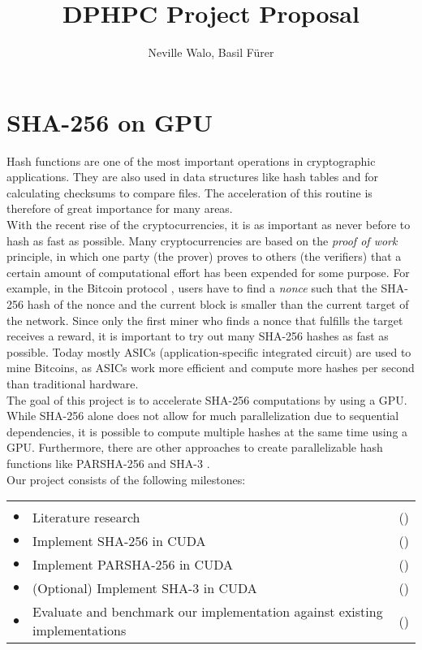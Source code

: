 \documentclass[a4paper]{article}
\author{Neville Walo, Basil F\"urer}
\title {DPHPC Project Proposal}
\newenvironment{reqlist}{%
  \par \medskip \noindent
  \begin{tabular}{cp{0.83\textwidth}r} \\[-24pt]}{\end{tabular}}
\newcommand{\req}{\\ \smallskip \smallskip $\bullet$\hspace{-0.2cm} & }
\newcounter{num}
\newcommand\effort[1]{\mbox{(\forloop{num}{0}{\value{num} < #1}{$\star$})}}
\begin{document}
\parindent 0pt
\maketitle

\section*{SHA-256 on GPU}
Hash functions are one of the most important operations in cryptographic applications. They are also used in data structures like hash tables and for calculating checksums to compare files. The acceleration of this routine is therefore of great importance for many areas.\\

With the recent rise of the cryptocurrencies, it is as important as never before to hash as fast as possible. 
Many cryptocurrencies are based on the \textit{proof of work} principle, in which one party (the prover) proves to others (the verifiers) that a certain amount of computational effort has been expended for some purpose. For example, in the Bitcoin protocol \cite{nakamoto2012bitcoin}, users have to find a \emph{nonce} such that the SHA-256 hash of the nonce and the current block is smaller than the current target of the network. Since only the first miner who finds a nonce that fulfills the target receives a reward, it is important to try out many SHA-256 hashes as fast as possible. Today mostly ASICs (application-specific integrated circuit) are used to mine Bitcoins, as ASICs work more efficient and compute more hashes per second than traditional hardware.\\


The goal of this project is to accelerate SHA-256 computations by using a GPU.
While SHA-256 alone does not allow for much parallelization due to sequential
dependencies, it is possible to compute multiple hashes at the same time using a GPU. Furthermore, there are other approaches to create parallelizable hash functions like PARSHA-256 \cite{parsha256} and SHA-3 \cite{sha3}.\\

Our project consists of the following milestones:

\begin{reqlist}
  \req Literature research    & \effort{1}
  \req Implement SHA-256 in CUDA~\cite{cuda}
    & \effort{3}

 
     \req Implement PARSHA-256 \cite{parsha256} in CUDA
    & \effort{4}
    
    \req (Optional) Implement SHA-3 \cite{sha3} in CUDA
    & \effort{5}
    
      \req Evaluate and benchmark our implementation against existing
       implementations~\cite{bench}    & \effort{2}
    
    
\end{reqlist}

\hfill



\end{document}
